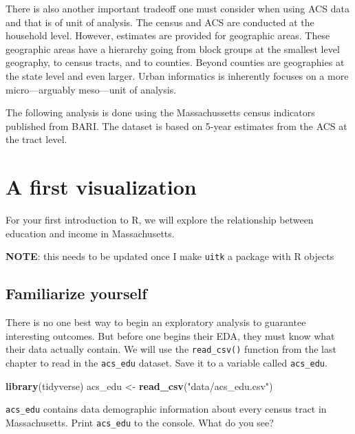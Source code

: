 \documentclass[
]{book}
\newenvironment{Shaded}{\begin{snugshade}}{\end{snugshade}}
\newcommand{\KeywordTok}[1]{\textcolor[rgb]{0.13,0.29,0.53}{\textbf{#1}}}
\newcommand{\NormalTok}[1]{#1}
\newcommand{\StringTok}[1]{\textcolor[rgb]{0.31,0.60,0.02}{#1}}
\begin{document}
There is also another important tradeoff one must consider when using ACS data and that is of unit of analysis. The census and ACS are conducted at the household level. However, estimates are provided for geographic areas. These geographic areas have a hierarchy going from block groups at the smallest level geography, to census tracts, and to counties. Beyond counties are geographies at the state level and even larger. Urban informatics is inherently focuses on a more micro---arguably meso---unit of analysis.

The following analysis is done using the Massachussetts census indicators published from BARI. The dataset is based on 5-year estimates from the ACS at the tract level.

\hypertarget{a-first-visualization}{%
\section{A first visualization}\label{a-first-visualization}}

For your first introduction to R, we will explore the relationship between education and income in Massachusetts.

\textbf{NOTE}: this needs to be updated once I make \texttt{uitk} a package with R objects

\hypertarget{familiarize-yourself}{%
\subsection{Familiarize yourself}\label{familiarize-yourself}}

There is no one best way to begin an exploratory analysis to guarantee interesting outcomes. But before one begins their EDA, they must know what their data actually contain. We will use the \texttt{read\_csv()} function from the last chapter to read in the \texttt{acs\_edu} dataset. Save it to a variable called \texttt{acs\_edu}.

\begin{Shaded}
\begin{Highlighting}[]
\KeywordTok{library}\NormalTok{(tidyverse)}
\NormalTok{acs\_edu \textless{}{-}}\StringTok{ }\KeywordTok{read\_csv}\NormalTok{(}\StringTok{"data/acs\_edu.csv"}\NormalTok{)}
\end{Highlighting}
\end{Shaded}

\texttt{acs\_edu} contains data demographic information about every census tract in Massachusetts. Print \texttt{acs\_edu} to the console. What do you see?
\end{document}
